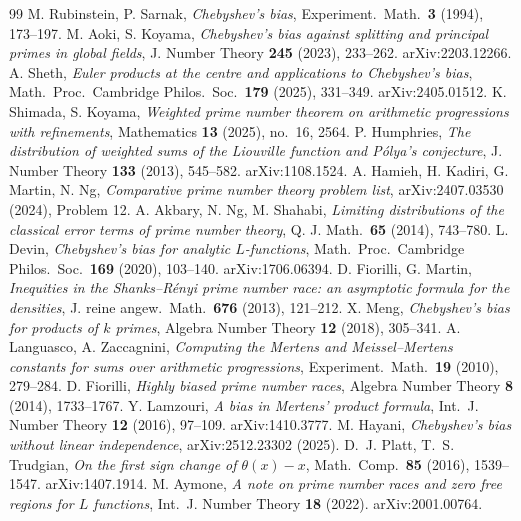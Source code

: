 \documentclass[11pt]{article}
\begin{document}
\begin{thebibliography}{99}
 M. Rubinstein, P. Sarnak, \emph{Chebyshev's bias},
Experiment.\ Math.\ \textbf{3} (1994), 173--197.
 M. Aoki, S. Koyama, \emph{Chebyshev's bias against
splitting and principal primes in global fields}, J. Number Theory
\textbf{245} (2023), 233--262. arXiv:2203.12266.
 A. Sheth, \emph{Euler products at the centre and
applications to Chebyshev's bias}, Math.\ Proc.\ Cambridge Philos.\
Soc.\ \textbf{179} (2025), 331--349. arXiv:2405.01512.
 K. Shimada, S. Koyama, \emph{Weighted prime number
theorem on arithmetic progressions with refinements}, Mathematics
\textbf{13} (2025), no.\ 16, 2564.
 P. Humphries, \emph{The distribution of weighted sums
of the Liouville function and P\'olya's conjecture}, J. Number Theory
\textbf{133} (2013), 545--582. arXiv:1108.1524.
 A. Hamieh, H. Kadiri, G. Martin, N. Ng,
\emph{Comparative prime number theory problem list}, arXiv:2407.03530
(2024), Problem 12.
 A. Akbary, N. Ng, M. Shahabi, \emph{Limiting
distributions of the classical error terms of prime number theory},
Q. J. Math.\ \textbf{65} (2014), 743--780.
 L. Devin, \emph{Chebyshev's bias for analytic
$L$-functions}, Math.\ Proc.\ Cambridge Philos.\ Soc.\ \textbf{169}
(2020), 103--140. arXiv:1706.06394.
 D. Fiorilli, G. Martin, \emph{Inequities in the
Shanks--R\'enyi prime number race: an asymptotic formula for the
densities}, J. reine angew.\ Math.\ \textbf{676} (2013), 121--212.
\bibitem{Meng18} X. Meng, \emph{Chebyshev's bias for products of $k$
primes}, Algebra Number Theory \textbf{12} (2018), 305--341.
 A. Languasco, A. Zaccagnini, \emph{Computing the
Mertens and Meissel--Mertens constants for sums over arithmetic
progressions}, Experiment.\ Math.\ \textbf{19} (2010), 279--284.
\bibitem{Fio14} D. Fiorilli, \emph{Highly biased prime number races},
Algebra Number Theory \textbf{8} (2014), 1733--1767.
 Y. Lamzouri, \emph{A bias in Mertens' product formula},
Int.\ J. Number Theory \textbf{12} (2016), 97--109. arXiv:1410.3777.
\bibitem{Hay25} M. Hayani, \emph{Chebyshev's bias without linear
independence}, arXiv:2512.23302 (2025).
 D.~J. Platt, T.~S. Trudgian, \emph{On the first sign
change of $\theta(x)-x$}, Math.\ Comp.\ \textbf{85} (2016), 1539--1547.
arXiv:1407.1914.
 M. Aymone, \emph{A note on prime number races and zero
free regions for $L$ functions}, Int.\ J. Number Theory \textbf{18}
(2022). arXiv:2001.00764.

\end{thebibliography}
\end{document}
